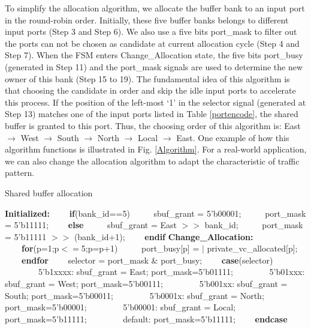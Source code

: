 \documentclass[10pt,conference]{IEEEtran}
\begin{document}
To simplify the allocation algorithm, we allocate the buffer bank to an input port in the round-robin order. Initially, these five buffer banks belongs to different input ports (Step 3 and Step 6). We also use a five bits port\_mask to filter out the ports can not be chosen as candidate at current allocation cycle (Step 4 and Step 7). When the FSM enters Change\_Allocation state, the five bits port\_busy (generated in Step 11) and the port\_mask signals are used to determine the new owner of this bank (Step 15 to 19). The fundamental idea of this algorithm is that choosing the candidate in order and skip the idle input ports to accelerate this process. If the position of the left-most `1' in the selector signal (generated at Step 13) matches one of the input ports listed in Table \ref{portencode}, the shared buffer is granted to this port. Thus, the choosing order of this algorithm is: East $\to$ West $\to$ South $\to$ North $\to$ Local $\to$ East. One example of how this algorithm functions is illustrated in Fig. \ref{Algorithm}. For a real-world application, we can also change the allocation algorithm to adapt the characteristic of traffic pattern.
\begin{algorithm}
\caption{Shared buffer allocation}\label{alg:bufferalloc}
\begin{algorithmic}[1]
\STATE \textbf{Initialized:}
\STATE \ \ \ \ \textbf{if}(bank\_id==5)
\STATE \ \ \ \ \ sbuf\_grant = 5'b00001;
\STATE \ \ \ \ \ port\_mask = 5'b11111;
\STATE \ \ \ \ \textbf{else}
\STATE \ \ \ \ \ sbuf\_grant = East $>>$ bank\_id;
\STATE \ \ \ \ \ port\_mask = 5'b11111 $>>$ (bank\_id+1);
\STATE \ \ \ \ \textbf{endif}
\STATE \textbf{Change\_Allocation:}
\STATE \ \ \ \ \textbf{for}(p=1;p$<=$5;p=p+1)
\STATE \ \ \ \ \ port\_busy[p] = $|$ private\_vc\_allocated[p];
\STATE \ \ \ \ \textbf{endfor}
\STATE \ \ \ \ selector = port\_mask \& port\_busy;
\STATE \ \ \ \ \textbf{case}(selector)
\STATE \ \ \ \ \ \ \ \ 5'b1xxxx: sbuf\_grant = East; port\_mask=5'b01111;
\STATE \ \ \ \ \ \ \ \ 5'b01xxx: sbuf\_grant = West; port\_mask=5'b00111;
\STATE \ \ \ \ \ \ \ \ 5'b001xx: sbuf\_grant = South; port\_mask=5'b00011;
\STATE \ \ \ \ \ \ \ \ 5'b0001x: sbuf\_grant = North; port\_mask=5'b00001;
\STATE \ \ \ \ \ \ \ \ 5'b00001: sbuf\_grant = Local; port\_mask=5'b11111;
\STATE \ \ \ \ \ \ \ \ default: port\_mask=5'b11111;
\STATE \ \ \ \ \textbf{endcase}
\end{algorithmic}
\end{algorithm}
\end{document}
